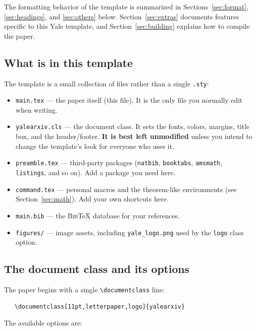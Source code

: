 \documentclass[11pt,letterpaper,logo]{yalearxiv}
\begin{document}
The formatting behavior of the template is summarized in
Sections~\ref{sec:format}, \ref{sec:headings}, and \ref{sec:others} below.
Section~\ref{sec:extras} documents features specific to this Yale template, and
Section~\ref{sec:building} explains how to compile the paper.

\subsection{What is in this template}
\label{sec:files}

The template is a small collection of files rather than a single \verb+.sty+:

\begin{itemize}
  \item \verb+main.tex+ --- the paper itself (this file). It is the only
    file you normally edit when writing.
  \item \verb+yalearxiv.cls+ --- the document class. It sets the fonts, colors,
    margins, title box, and the header/footer. \textbf{It is best left unmodified}
    unless you intend to change the template's look for everyone who uses it.
  \item \verb+preamble.tex+ --- third-party packages (\verb+natbib+,
    \verb+booktabs+, \verb+amsmath+, \verb+listings+, and so on). Add a package
    you need here.
  \item \verb+command.tex+ --- personal macros and the theorem-like environments
    (see Section~\ref{sec:math}). Add your own shortcuts here.
  \item \verb+main.bib+ --- the \textsc{Bib}\TeX{} database for your references.
  \item \verb+figures/+ --- image assets, including \verb+yale_logo.png+ used by
    the \verb+logo+ class option.
\end{itemize}

\subsection{The document class and its options}
\label{sec:options}

The paper begins with a single \verb+\documentclass+ line:
\begin{verbatim}
   \documentclass[11pt,letterpaper,logo]{yalearxiv}
\end{verbatim}
The available options are:
\end{document}
